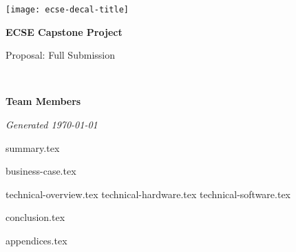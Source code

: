 \documentclass{capstone}
\begin{document}

\titlepage
	{\texttt{[image: ecse-decal-title]}}
	{
		\centering\sffamily
		{\Huge\bfseries ECSE Capstone Project\par}
		\vspace{16pt} 
		{\LARGE Proposal: Full Submission\par} 
		\vspace{24pt}
		{\huge\bfseries \teamname\par} %
	}


~\vfill

\noindent \textbf{Team Members}
\teammembers

\noindent \textit{Generated \today}

\tableofcontents

{summary.tex}

{business-case.tex}

{technical-overview.tex}
{technical-hardware.tex}
{technical-software.tex}

{conclusion.tex}

\begin{appendices}
{appendices.tex}
\end{appendices}
\end{document}
